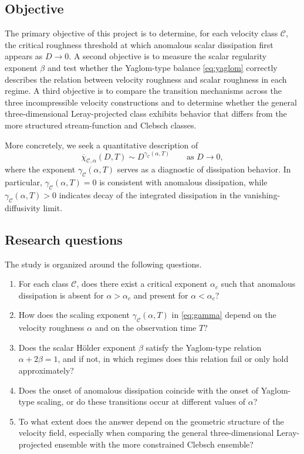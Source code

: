 \subsection{Objective}

The primary objective of this project is to determine, for each velocity class $\mathcal{C}$, the critical roughness threshold at which anomalous scalar dissipation first appears as $D\to0$. A second objective is to measure the scalar regularity exponent $\beta$ and test whether the Yaglom-type balance \eqref{eq:yaglom} correctly describes the relation between velocity roughness and scalar roughness in each regime. A third objective is to compare the transition mechanisms across the three incompressible velocity constructions and to determine whether the general three-dimensional Leray-projected class exhibits behavior that differs from the more structured stream-function and Clebsch classes.

More concretely, we seek a quantitative description of
\begin{equation}
\overline{\chi}_{\mathcal{C},\alpha}(D,T)
\sim D^{\gamma_{\mathcal{C}}(\alpha,T)}
\qquad \text{as } D\to0,
\label{eq:gamma}
\end{equation}
where the exponent $\gamma_{\mathcal{C}}(\alpha,T)$ serves as a diagnostic of dissipation behavior. In particular, $\gamma_{\mathcal{C}}(\alpha,T)=0$ is consistent with anomalous dissipation, while $\gamma_{\mathcal{C}}(\alpha,T)>0$ indicates decay of the integrated dissipation in the vanishing-diffusivity limit.

\subsection{Research questions}

The study is organized around the following questions.

\begin{enumerate}
    \item For each class $\mathcal{C}$, does there exist a critical exponent $\alpha_c$ such that anomalous dissipation is absent for $\alpha>\alpha_c$ and present for $\alpha<\alpha_c$?

    \item How does the scaling exponent $\gamma_{\mathcal{C}}(\alpha,T)$ in \eqref{eq:gamma} depend on the velocity roughness $\alpha$ and on the observation time $T$?

    \item Does the scalar H\"older exponent $\beta$ satisfy the Yaglom-type relation $\alpha+2\beta=1$, and if not, in which regimes does this relation fail or only hold approximately?

    \item Does the onset of anomalous dissipation coincide with the onset of Yaglom-type scaling, or do these transitions occur at different values of $\alpha$?

    \item To what extent does the answer depend on the geometric structure of the velocity field, especially when comparing the general three-dimensional Leray-projected ensemble with the more constrained Clebsch ensemble?
\end{enumerate}

